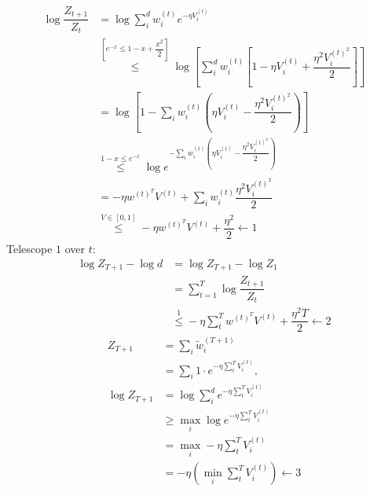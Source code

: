 \documentclass{article}
\begin{document}
\begin{align*}
\log \dfrac{Z_{t+1}}{Z_{t}} &= \log \displaystyle\sum_{i}^{d} w_{i}^{\left(t\right)} e^{- \eta V_{i}^{\left(t\right)}}
\\ &\stackrel{\left[e^{-x} \leq  1 - x + \dfrac{x^{2}}{2}\right]}{\leq} \log\left[\displaystyle\sum_{i}^{d} w_{i}^{\left(t\right)} \left[1 - \eta V_{i}^{\left(t\right)} + \dfrac{\eta^{2} V_{i}^{\left(t\right)^{2}}}{2}\right]\right]
\\ &= \log\left[1 - \displaystyle\sum_{i} w_{i}^{\left(t\right)} \left(\eta V_{i}^{\left(t\right)} - \dfrac{\eta^{2} V_{i}^{\left(t\right)^{2}}}{2}\right)\right]
\\ &\stackrel{1 - x \leq  e^{-x}}{\leq} \log e^{-\displaystyle\sum_{i} w_{i}^{\left(t\right)} \left(\eta V_{i}^{\left(t\right)} - \dfrac{\eta^{2} V_{i}^{\left(t\right)^{2}}}{2}\right)}
\\ &= -\eta w^{\left(t\right)^{T}} V^{\left(t\right)} + \displaystyle\sum_{i} w_{i}^{\left(t\right)} \dfrac{\eta^{2} V_{i}^{\left(t\right)^{2}}}{2}
\\ &\stackrel{V \in \left[0, 1\right]}{\leq} -\eta w^{\left(t\right)^{T}} V^{\left(t\right)} + \dfrac{\eta^{2}}{2} \leftarrow \boxed{1}
\end{align*}
Telescope $\boxed{1}$ over $t: $
\begin{align*}
\log Z_{T+1} - \log d &= \log Z_{T+1} - \log Z_{1}
\\ &= \displaystyle\sum_{t=1}^{T} \log \dfrac{Z_{t+1}}{Z_{t}}
\\ &\stackrel{\boxed{1}}{\leq} - \eta \displaystyle\sum_{t}^{T} w^{\left(t\right)^{T}} V^{\left(t\right)} + \dfrac{\eta^{2} T}{2} \leftarrow \boxed{2}
\end{align*}
\begin{align*}
Z_{T+1} &= \displaystyle\sum_{i} \tilde{w}_{i}^{\left(T + 1\right)}
\\ &= \displaystyle\sum_{i} 1 \cdot  e^{-\eta \displaystyle\sum_{t}^{T} V_{i}^{\left(t\right)}},
\\ \log Z_{T+1} &= \log \displaystyle\sum_{i}^{d} e^{-\eta \displaystyle\sum_{t}^{T} V_{i}^{\left(t\right)}}
\\ &\geq  \displaystyle\max_{i} \log e^{-\eta \displaystyle\sum_{t}^{T} V_{i}^{\left(t\right)}}
\\ &= \displaystyle\max_{i} - \eta \displaystyle\sum_{t}^{T} V_{i}^{\left(t\right)}
\\ &= - \eta \left(\displaystyle\min_{i} \displaystyle\sum_{t}^{T} V_{i}^{\left(t\right)}\right) \leftarrow \boxed{3}
\end{align*}
\end{document}
